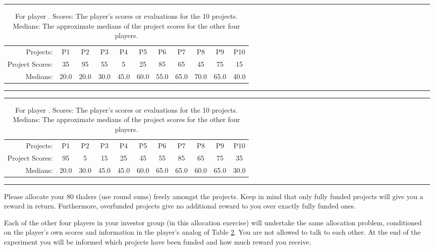 \documentclass[11pt, oneside]{article}   	%
\begin{document}
\fi
\ifnum{}
\begin{table}[h]
\centering
\rule{\textwidth}{1pt}
\begin{tabular}{r|cccccccccc}
Projects: & P1 & P2 & P3 & P4 & P5 & P6 & P7 & P8 & P9 & P10 \\
Project Scores: & 35 & 95 & 55 & 5 & 25 & 85 & 65 & 45 & 75 & 15 \\
Medians: & 20.0 & 20.0 & 30.0 & 45.0 & 60.0 & 55.0 & 65.0 & 70.0 & 65.0 & 40.0 \\
\end{tabular}
\caption{For player \theplayer . Scores: The player's scores or evaluations for the 10 projects. Medians: The approximate medians of the project scores for the other four players.}
\label{fig:scorescase2}
\rule{\textwidth}{1pt}
\end{table}
\fi
\ifnum{}
\begin{table}[h]
\centering
\rule{\textwidth}{1pt}
\begin{tabular}{r|cccccccccc}
Projects: & P1 & P2 & P3 & P4 & P5 & P6 & P7 & P8 & P9 & P10 \\
Project Scores: & 95 & 5 & 15 & 25 & 45 & 55 & 85 & 65 & 75 & 35 \\
Medians: & 20.0 & 30.0 & 45.0 & 45.0 & 60.0 & 65.0 & 65.0 & 60.0 & 65.0 & 30.0 \\
\end{tabular}
\caption{For player \theplayer . Scores: The player's scores or evaluations for the 10 projects. Medians: The approximate medians of the project scores for the other four players.}
\label{fig:scorescase2}
\rule{\textwidth}{1pt}
\end{table}
\fi



Please allocate your 80 thalers (use round sums) freely amongst the projects. Keep in mind that only fully funded projects  will give you a reward in return.
Furthermore, overfunded projects give no additional reward to you over exactly fully funded ones.

Each of the other four players in your investor group (in this allocation exercise) will undertake the same allocation problem, conditioned on the player's own scores and information in the player's analog of Table \ref{fig:scorescase2}. You are not allowed to talk to each other. At the end of the experiment you will be informed which projects have been funded and how much reward you receive.
\end{document}
